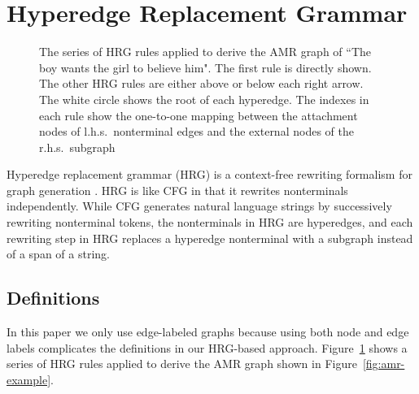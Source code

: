 \section{Hyperedge Replacement Grammar}
\begin{figure}
\begin{center}
\caption{The series of HRG rules applied to derive the AMR graph of ``The boy wants the girl to believe him". The first rule is directly shown. The other HRG rules
are either above or below each right arrow. The white circle shows the root of each hyperedge. The indexes in each rule show the one-to-one mapping
between the attachment nodes of l.h.s.\ nonterminal edges and the external nodes of the r.h.s.\ subgraph}
\label{fig:hrg-example}
\vspace{-1em}
\end{center}
\end{figure}
Hyperedge replacement grammar (HRG) is a context-free rewriting formalism for graph generation \cite{drewes+al:1997}. 
HRG is like CFG in that it rewrites nonterminals independently.
While CFG generates natural language strings by successively rewriting nonterminal tokens, the nonterminals in 
HRG are hyperedges, and each rewriting step in HRG replaces a hyperedge nonterminal with a subgraph instead of a span of a string.
\subsection{Definitions}
In this paper we only use edge-labeled graphs
because using both node and edge labels complicates the definitions in our HRG-based approach. Figure~\ref{fig:hrg-example} 
shows a series of HRG rules applied to derive the AMR graph shown in Figure~\ref{fig:amr-example}.


